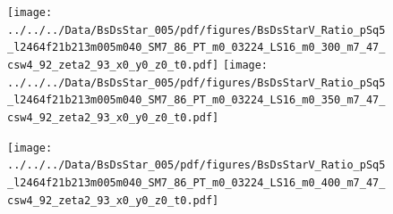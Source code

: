 \documentclass[a4paper,10pt]{article}
\begin{document}
\clearpage
\begin{figure}[p]
 \texttt{[image: ../../../Data/BsDsStar\_005/pdf/figures/BsDsStarV\_Ratio\_pSq5\_l2464f21b213m005m040\_SM7\_86\_PT\_m0\_03224\_LS16\_m0\_300\_m7\_47\_csw4\_92\_zeta2\_93\_x0\_y0\_z0\_t0.pdf]} 
 \texttt{[image: ../../../Data/BsDsStar\_005/pdf/figures/BsDsStarV\_Ratio\_pSq5\_l2464f21b213m005m040\_SM7\_86\_PT\_m0\_03224\_LS16\_m0\_350\_m7\_47\_csw4\_92\_zeta2\_93\_x0\_y0\_z0\_t0.pdf]} 
 \end{figure}
\begin{figure}[p]
 \texttt{[image: ../../../Data/BsDsStar\_005/pdf/figures/BsDsStarV\_Ratio\_pSq5\_l2464f21b213m005m040\_SM7\_86\_PT\_m0\_03224\_LS16\_m0\_400\_m7\_47\_csw4\_92\_zeta2\_93\_x0\_y0\_z0\_t0.pdf]} 
 \end{figure}
\clearpage
\end{document}
